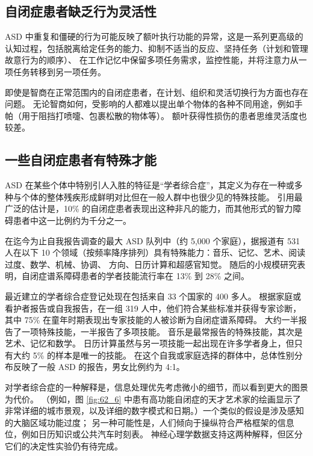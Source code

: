 \subsection{自闭症患者缺乏行为灵活性}
ASD 中重复和僵硬的行为可能反映了额叶执行功能的异常，这是一系列更高级的认知过程，包括脱离给定任务的能力、抑制不适当的反应、坚持任务（计划和管理故意行为的顺序）、 在工作记忆中保留多项任务需求，监控性能，并将注意力从一项任务转移到另一项任务。

即使是智商在正常范围内的自闭症患者，在计划、组织和灵活切换行为方面也存在问题。 无论智商如何，受影响的人都难以提出单个物体的各种不同用途，例如手帕（用于阻挡打喷嚏、包裹松散的物体等）。 额叶获得性损伤的患者思维灵活度也较差。

\subsection{一些自闭症患者有特殊才能}

ASD 在某些个体中特别引人入胜的特征是“学者综合症”，其定义为存在一种或多种与个体的整体残疾形成鲜明对比但在一般人群中也很少见的特殊技能。 引用最广泛的估计是，10\% 的自闭症患者表现出这种非凡的能力，而其他形式的智力障碍患者中这一比例约为千分之一。

在迄今为止自我报告调查的最大 ASD 队列中（约 5,000 个家庭），据报道有 531 人在以下 10 个领域（按频率降序排列）具有特殊能力：音乐、记忆、艺术、阅读过度、数学、机械、协调、 方向、日历计算和超感官知觉。 随后的小规模研究表明，自闭症谱系障碍患者的学者技能流行率在 13\% 到 28\% 之间。

最近建立的学者综合症登记处现在包括来自 33 个国家的 400 多人。 根据家庭或看护者报告或自我报告，在一组 319 人中，他们符合某些标准并获得专家诊断，其中 75\% 在童年时期表现出专家技能的人被诊断为自闭症谱系障碍。 大约一半报告了一项特殊技能，一半报告了多项技能。 音乐是最常报告的特殊技能，其次是艺术、记忆和数学。 日历计算虽然与另一项技能一起出现在许多学者身上，但只有大约 5\% 的样本是唯一的技能。 在这个自我或家庭选择的群体中，总体性别分布反映了一般 ASD 的报告，男女比例约为 4:1。

对学者综合症的一种解释是，信息处理优先考虑微小的细节，而以看到更大的图景为代价。 （例如，图 \ref{fig:62_6} 中患有高功能自闭症的天才艺术家的绘画显示了非常详细的城市景观，以及详细的数字模式和日期。）一个类似的假设是涉及感知的大脑区域功能过度； 另一种可能性是，人们倾向于操纵符合严格框架的信息位，例如日历知识或公共汽车时刻表。 神经心理学数据支持这两种解释，但区分它们的决定性实验仍有待完成。

